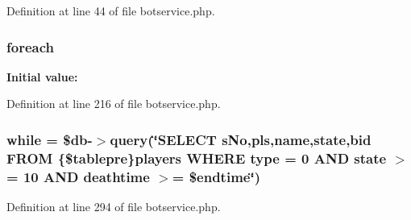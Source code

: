 Definition at line 44 of file botservice.\+php.

\hypertarget{botservice_8php_a38ecd1c3a346f8a22ecd29f0de0cc1dc}{
\subsubsection[{foreach}]{\setlength{\rightskip}{0pt plus 5cm}foreach}}\label{botservice_8php_a38ecd1c3a346f8a22ecd29f0de0cc1dc}
{\bfseries Initial value\+:}


Definition at line 216 of file botservice.\+php.

\hypertarget{botservice_8php_a9397939c237959113b21e7e4a5de37cb}{
\subsubsection[{while}]{\setlength{\rightskip}{0pt plus 5cm}while = \$db-\/$>$query(\char`\"{}S\+E\+L\+E\+C\+T s\+No,pls,name,state,bid F\+R\+O\+M \{\$tablepre\}players W\+H\+E\+R\+E type = 0 A\+N\+D state $>$= 10 A\+N\+D deathtime $>$= \$endtime\char`\"{})}}\label{botservice_8php_a9397939c237959113b21e7e4a5de37cb}


Definition at line 294 of file botservice.\+php.


